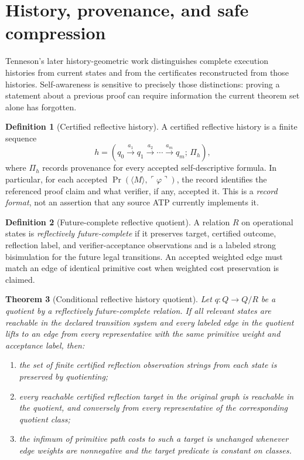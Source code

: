 \documentclass[11pt,letterpaper]{article}
\newtheorem{theorem}{Theorem}[section]
\theoremstyle{definition}\newtheorem{definition}[theorem]{Definition}\newtheorem{example}[theorem]{Example}\newtheorem{protocol}[theorem]{Protocol}\newtheorem{question}[theorem]{Open Problem}
\theoremstyle{remark}\newtheorem{remark}[theorem]{Remark}
\newcommand{\Prov}{\operatorname{Pr}}
\newcommand{\Mtag}{\langle M\rangle}
\newcommand{\qname}[1]{\ulcorner #1\urcorner}
\begin{document}
\section{History, provenance, and safe compression}
Tenneson's later history-geometric work distinguishes complete execution histories from current states and from the certificates reconstructed from those histories. Self-awareness is sensitive to precisely those distinctions: proving a statement about a previous proof can require information the current theorem set alone has forgotten.
\begin{definition}[Certified reflective history]
A certified reflective history is a finite sequence
\[
h=(q_0\xrightarrow{a_1}q_1\xrightarrow{a_2}\cdots\xrightarrow{a_m}q_m;\,\Pi_h),
\]
where $\Pi_h$ records provenance for every accepted self-descriptive formula. In particular, for each accepted $\Prov(\Mtag,\qname{\varphi})$, the record identifies the referenced proof claim and what verifier, if any, accepted it. This is a \emph{record format}, not an assertion that any source ATP currently implements it.
\end{definition}
\begin{definition}[Future-complete reflective quotient]
A relation $R$ on operational states is \emph{reflectively future-complete} if it preserves target, certified outcome, reflection label, and verifier-acceptance observations and is a labeled strong bisimulation for the future legal transitions. An accepted weighted edge must match an edge of identical primitive cost when weighted cost preservation is claimed.
\end{definition}
\begin{theorem}[Conditional reflective history quotient]\label{thm:quot}
Let $q:Q\to Q/R$ be a quotient by a reflectively future-complete relation. If all relevant states are reachable in the declared transition system and every labeled edge in the quotient lifts to an edge from every representative with the same primitive weight and acceptance label, then:
\begin{enumerate}[label=(\roman*)]
\item the set of finite certified reflection observation strings from each state is preserved by quotienting;
\item every reachable certified reflection target in the original graph is reachable in the quotient, and conversely from every representative of the corresponding quotient class;
\item the infimum of primitive path costs to such a target is unchanged whenever edge weights are nonnegative and the target predicate is constant on classes.
\end{enumerate}
\end{theorem}
\end{document}
